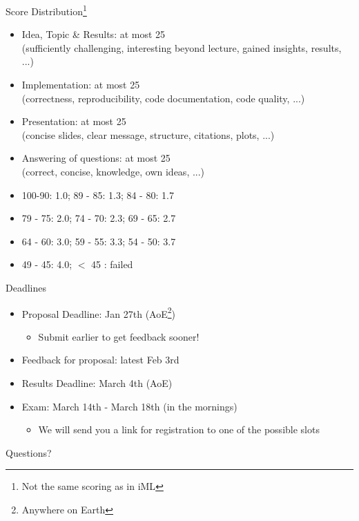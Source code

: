 \documentclass[aspectratio=169]{../latex_main/tntbeamer}  %
\begin{document}
\begin{frame}[c]{Score Distribution\footnote{Not the same scoring as in iML}}
	\vspace{-1em}
	\begin{itemize}
		\item Idea, Topic \& Results: at most 25\\
        (sufficiently challenging, interesting beyond lecture, gained insights, results, ...)
        \item Implementation:  at most 25\\
        (correctness, reproducibility, code documentation, code quality, ...)
        \item Presentation: at most 25\\
        (concise slides, clear message, structure, citations, plots, ...)
        \item Answering of questions: at most 25\\
        (correct, concise, knowledge, own ideas, ...)
	\end{itemize}
	\pause
	\begin{itemize}
	    \item 100-90: 1.0; 89 - 85: 1.3; 84 - 80: 1.7
	    \item 79 - 75: 2.0; 74 - 70: 2.3; 69 - 65: 2.7
	    \item 64 - 60: 3.0; 59 - 55: 3.3; 54 - 50: 3.7
	    \item 49 - 45: 4.0; $<$ 45 : failed
	\end{itemize}
	
\end{frame}
\begin{frame}[c]{Deadlines}
	
	\begin{itemize}
		\item Proposal Deadline: Jan 27th (AoE\footnote{Anywhere on Earth})
		\begin{itemize}
			\item Submit earlier to get feedback sooner!
		\end{itemize}
		\item Feedback for proposal: latest Feb 3rd
		\item Results Deadline: March 4th (AoE) 
		\item Exam: March 14th - March 18th (in the mornings)
		\begin{itemize}
			\item We will send you a link for registration to one of the possible slots
		\end{itemize}
	\end{itemize}
	
\end{frame}


\begin{frame}[c]{}
	
	\centering
	\huge
	Questions?
	
\end{frame}


\end{document}
